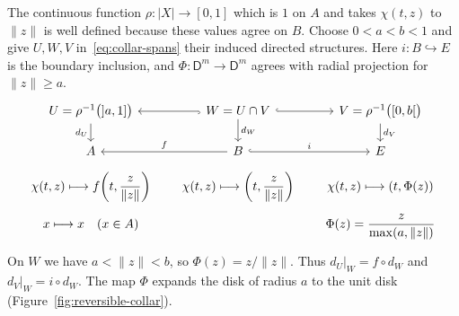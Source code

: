 \documentclass[12pt,a4paper]{amsart}
\theoremstyle{definition}
\renewcommand{\geq}{\geqslant}
\newcommand{\abs}[1]{\lvert#1\rvert}
\begin{document}
The continuous function $\rho\colon\abs X\to[0,1]$ which is $1$ on $A$ and takes $\chi(t,z)$ to $\|z\|$ is well defined because these values agree on $B$. Choose $0<a<b<1$ and give $U,W,V$ in~\eqref{eq:collar-spans} their induced directed structures. Here $i\colon B\hookrightarrow E$ is the boundary inclusion, and $\Phi\colon\mathsf{D}^m\to\mathsf{D}^m$ agrees with radial projection for $\|z\|\geq a$.
\begin{equation}\label{eq:collar-spans}
\begin{tikzcd}[column sep=1.65em,row sep=.22em]
 U=\rho^{-1}\bigl({]}a,1]\bigr)\ar[d,"d_U"'] &
 W=U\cap V\ar[l,hook]\ar[r,hook]\ar[d,"d_W"] &
 V=\rho^{-1}\bigl([0,b[\bigr)\ar[d,"d_V"] \\[1.25em]
 A & B\ar[l,"f"']\ar[r,hook,"i"] & E \\[.4em]
 {\chi(t,z)\longmapsto f\!\left(t,\dfrac{z}{\|z\|}\right)} &
 {\chi(t,z)\longmapsto \left(t,\dfrac{z}{\|z\|}\right)} &
 {\chi(t,z)\longmapsto(t,\Phi(z))} \\
 {x\longmapsto x\quad(x\in A)} & {} &
 {\Phi(z)=\dfrac{z}{\max(a,\|z\|)}}
\end{tikzcd}
\end{equation}
On $W$ we have $a<\|z\|<b$, so $\Phi(z)=z/\|z\|$. Thus $d_U|_W=f\circ d_W$ and $d_V|_W=i\circ d_W$. The map $\Phi$ expands the disk of radius $a$ to the unit disk (Figure~\ref{fig:reversible-collar}).
\end{document}
